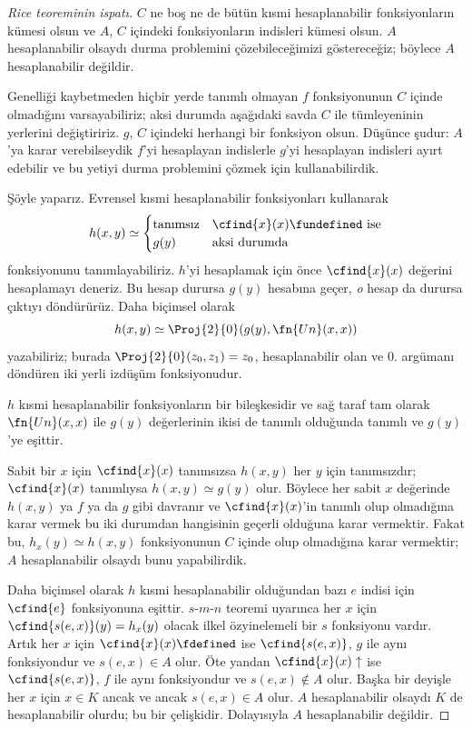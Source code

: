 \begin{proof}[Rice teoreminin ispatı]
$C$ ne boş ne de bütün kısmi hesaplanabilir fonksiyonların kümesi olsun ve
$A$, $C$ içindeki fonksiyonların indisleri kümesi olsun. $A$ hesaplanabilir
olsaydı durma problemini çözebileceğimizi göstereceğiz; böylece $A$
hesaplanabilir değildir.

Genelliği kaybetmeden hiçbir yerde tanımlı olmayan $f$ fonksiyonunun $C$
içinde olmadığını varsayabiliriz; aksi durumda aşağıdaki savda $C$ ile
tümleyeninin yerlerini değiştiririz. $g$, $C$ içindeki herhangi bir fonksiyon
olsun. Düşünce şudur: $A$'ya karar verebilseydik $f$'yi hesaplayan indislerle
$g$'yi hesaplayan indisleri ayırt edebilir ve bu yetiyi durma problemini
çözmek için kullanabilirdik.

Şöyle yaparız. Evrensel kısmi hesaplanabilir fonksiyonları kullanarak
\[
  h(x,y)\simeq\begin{cases}
    \text{tanımsız} & \text{$\cfind{x}(x)\fundefined$ ise}\\
    g(y) & \text{aksi durumda}
  \end{cases}
\]
fonksiyonunu tanımlayabiliriz. $h$'yi hesaplamak için önce
$\cfind{x}(x)$ değerini hesaplamayı deneriz. Bu hesap durursa $g(y)$
hesabına geçer, \emph{o} hesap da durursa çıktıyı döndürürüz. Daha biçimsel
olarak
\[
  h(x,y)\simeq\Proj{2}{0}(g(y),\fn{Un}(x,x))
\]
yazabiliriz; burada $\Proj{2}{0}(z_0,z_1)=z_0$, hesaplanabilir olan ve
$0$. argümanı döndüren iki yerli izdüşüm fonksiyonudur.

$h$ kısmi hesaplanabilir fonksiyonların bir bileşkesidir ve sağ taraf tam
olarak $\fn{Un}(x,x)$ ile $g(y)$ değerlerinin ikisi de tanımlı olduğunda
tanımlı ve $g(y)$'ye eşittir.

Sabit bir $x$ için $\cfind{x}(x)$ tanımsızsa $h(x,y)$ her $y$ için
tanımsızdır; $\cfind{x}(x)$ tanımlıysa $h(x,y)\simeq g(y)$ olur. Böylece
her sabit $x$ değerinde $h(x,y)$ ya $f$ ya da $g$ gibi davranır ve
$\cfind{x}(x)$'in tanımlı olup olmadığına karar vermek bu iki durumdan
hangisinin geçerli olduğuna karar vermektir. Fakat bu, $h_x(y)\simeq h(x,y)$
fonksiyonunun $C$ içinde olup olmadığına karar vermektir; $A$
hesaplanabilir olsaydı bunu yapabilirdik.

Daha biçimsel olarak $h$ kısmi hesaplanabilir olduğundan bazı $e$ indisi için
$\cfind{e}$ fonksiyonuna eşittir. $s$-$m$-$n$ teoremi uyarınca her $x$ için
$\cfind{s(e,x)}(y)=h_x(y)$ olacak ilkel özyinelemeli bir $s$ fonksiyonu
vardır. Artık her $x$ için $\cfind{x}(x)\fdefined$ ise
$\cfind{s(e,x)}$, $g$ ile aynı fonksiyondur ve $s(e,x)\in A$ olur. Öte
yandan $\cfind{x}(x)\uparrow$ ise $\cfind{s(e,x)}$, $f$ ile aynı
fonksiyondur ve $s(e,x)\notin A$ olur. Başka bir deyişle her $x$ için
$x\in K$ ancak ve ancak $s(e,x)\in A$ olur. $A$ hesaplanabilir olsaydı
$K$ de hesaplanabilir olurdu; bu bir çelişkidir. Dolayısıyla $A$
hesaplanabilir değildir.
\end{proof}

